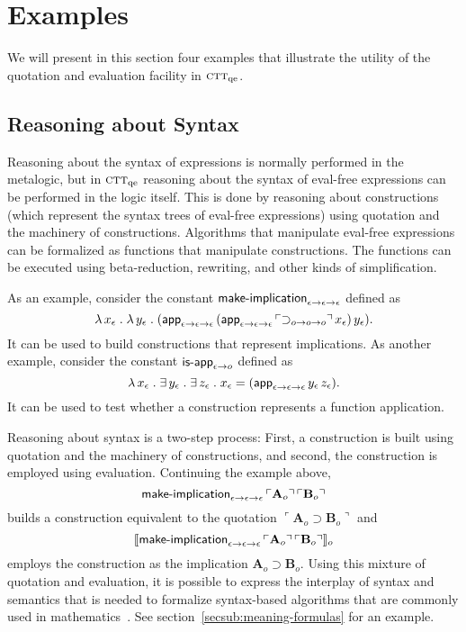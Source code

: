 \documentclass[fleqn]{llncs}
\newcommand{\churchqe}{$\mbox{\sc ctt}_{\rm qe}$}
\newcommand{\sembrack}[1]{\llbracket#1\rrbracket}
\newcommand{\synbrack}[1]{\ulcorner#1\urcorner}
\newcommand{\mname}[1]{\mbox{\sf #1}}
\newcommand{\mdot}{\mathrel.}
\newcommand{\tarrow}{\rightarrow}
\newcommand{\LambdaApp}{\lambda\,}
\newcommand{\Implies}{\supset}
\newcommand{\ForsomeApp}{\exists\,}
\begin{document}
\section{Examples}

We will present in this section four examples that illustrate the
utility of the quotation and evaluation facility in {\churchqe}.

\subsection{Reasoning about Syntax}

Reasoning about the syntax of expressions is normally performed in the
metalogic, but in {\churchqe} reasoning about the syntax of eval-free
expressions can be performed in the logic itself.  This is done by
reasoning about constructions (which represent the syntax trees of
eval-free expressions) using quotation and the machinery of
constructions.  Algorithms that manipulate eval-free expressions can
be formalized as functions that manipulate constructions.  The
functions can be executed using beta-reduction, rewriting, and other
kinds of simplification.

As an example, consider the constant
$\mname{make-implication}_{\epsilon \tarrow \epsilon \tarrow
  \epsilon}$ defined as
\[\LambdaApp x_\epsilon \mdot \LambdaApp y_\epsilon \mdot
(\mname{app}_{\epsilon \tarrow \epsilon \tarrow \epsilon} \,
(\mname{app}_{\epsilon \tarrow \epsilon \tarrow \epsilon} \,
\synbrack{\Implies_{o \tarrow o \tarrow o}} \, x_\epsilon) \,
y_\epsilon).\] It can be used to build constructions that
represent implications.  As another example, consider the constant
$\mname{is-app}_{\epsilon \tarrow o}$ defined as
\[\LambdaApp x_\epsilon \mdot
\ForsomeApp y_\epsilon \mdot \ForsomeApp z_\epsilon
\mdot x_\epsilon = (\mname{app}_{\epsilon \tarrow \epsilon
  \tarrow \epsilon} \, y_\epsilon \, z_\epsilon).\]
It can be used to test whether a construction represents a function
application.

Reasoning about syntax is a two-step process: First, a construction is
built using quotation and the machinery of constructions, and second,
the construction is employed using evaluation.  Continuing the example
above, \[\mname{make-implication}_{\epsilon \tarrow \epsilon \tarrow
  \epsilon} \, \synbrack{\textbf{A}_o} \, \synbrack{\textbf{B}_o}\]
builds a construction equivalent to the quotation
$\synbrack{\textbf{A}_o \Implies \textbf{B}_o}$ and
\[\sembrack{\mname{make-implication}_{\epsilon \tarrow \epsilon \tarrow
  \epsilon} \, \synbrack{\textbf{A}_o} \, \synbrack{\textbf{B}_o}}_o\]
employs the construction as the implication $\textbf{A}_o \Implies
\textbf{B}_o$.  Using this mixture of quotation and evaluation, it is
possible to express the interplay of syntax and semantics that is
needed to formalize syntax-based algorithms that are commonly used in
mathematics~\cite{Farmer13}.  See
section~\ref{secsub:meaning-formulas} for an example.
\end{document}

